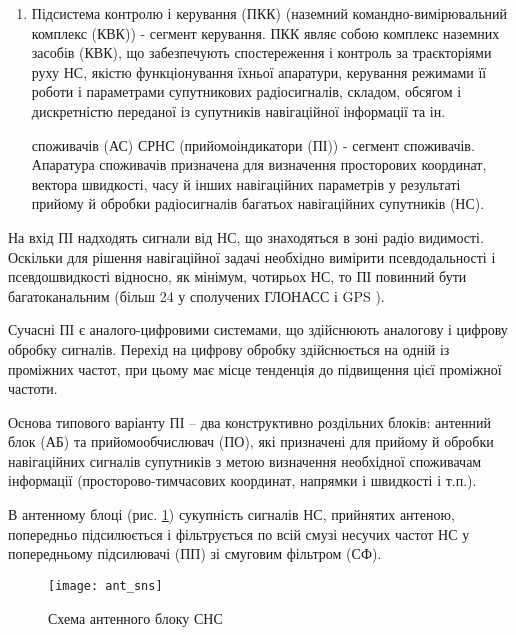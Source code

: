 \begin{enumerate}

 космічних апаратів (ПКА), що складається з навігаційних супутників (НС) 
(мережа навігаційних супутників - космічний сегмент). ПКА СРНС складається з визначеного 
числа навігаційних супутників. Основні функції НС --- формування і випромінювання 
радіосигналів, необхідних для навігаційних визначень споживачів СРНС, контролю бортових 
систем супутника підсистемою контролю і керування СРНС. Відповідні характеристики сигналів 
НС і способи їхньої обробки дозволяють проводити навігаційні виміри з високою точністю.

 \item Підсистема контролю і керування (ПКК) (наземний командно-вимірювальний комплекс (КВК)) - 
сегмент керування. ПКК являє собою комплекс наземних засобів (КВК), що забезпечують 
спостереження і контроль за траєкторіями руху НС, якістю функціонування їхньої апаратури, 
керування режимами її роботи і параметрами супутникових радіосигналів, складом, обсягом і 
дискретністю переданої із супутників навігаційної інформації та ін.

  споживачів (АС) СРНС (прийомоіндикатори (ПІ)) - сегмент споживачів.
Апаратура споживачів призначена для визначення просторових координат, вектора швидкості, 
часу й інших навігаційних параметрів у результаті прийому й обробки радіосигналів багатьох 
навігаційних супутників (НС).

\end{enumerate}
На вхід ПІ надходять сигнали від НС, що знаходяться в зоні радіо видимості. Оскільки для 
рішення навігаційної задачі необхідно вимірити псевдодальності і псевдошвидкості відносно, 
як мінімум, чотирьох НС, то ПІ повинний бути багатоканальним (більш 24 у сполучених ГЛОНАСС і GPS ).

Сучасні ПІ є аналого-цифровими системами, що здійснюють аналогову і цифрову обробку 
сигналів. Перехід на цифрову обробку здійснюється на одній із проміжних частот, при 
цьому має місце тенденція до підвищення цієї проміжної частоти.

Основа типового варіанту ПІ -- два конструктивно роздільних блоків: антенний блок (АБ) та 
прийомообчислювач (ПО), які призначені для прийому й обробки навігаційних сигналів 
супутників з метою визначення необхідної споживачам інформації (просторово-тимчасових 
координат, напрямки і швидкості і т.п.).

В антенному блоці (рис. \ref{fig:ant_sns}) сукупність сигналів НС, прийнятих антеною, попередньо 
підсилюється і фільтрується по всій смузі несучих частот НС у попередньому підсилювачі 
(ПП) зі смуговим фільтром (СФ). 
\begin{figure}[here]
\centering
\texttt{[image: ant\_sns]}
\caption{Схема антенного блоку СНС}
\label{fig:ant_sns}
\end{figure} 

